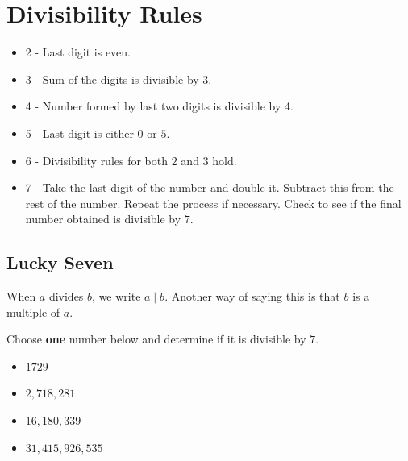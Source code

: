 \clearpage  



\thispagestyle{empty} %

\small\tableofcontents %

\clearpage

\section{Divisibility Rules}

\begin{itemize}
\item  2 - Last digit is even. 
\item  3 - Sum of the digits is divisible by 3.
\item 4  - Number formed by last two digits is divisible by 4.
\item 5 - Last digit is either $0$ or $5$.
\item 6 -  Divisibility rules for both $2$ and $3$ hold.
\item 7  - Take the last digit of the number and double it.  Subtract this from the rest of the number.  Repeat the process if necessary.  Check to see if the final number obtained is divisible by $7$. \cite{a:1} 
\end{itemize}




\clearpage

\subsection*{Lucky Seven}

\begin{defi} When $a$ divides $b$, we write $a\mid b$. Another way of saying this is that $b$ is a multiple of $a$. \end{defi}

Choose \textbf{one} number below and determine if it is divisible by $7$.
\begin{itemize}
	\item $1729$
	\item $2,718,281$
	\item $16,180,339$
	\item $31,415,926,535$
\end{itemize}

